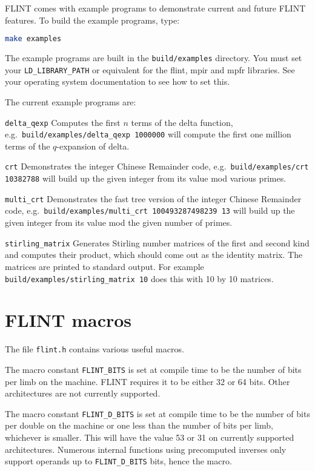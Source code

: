 \documentclass[a4paper,10pt]{book}
\newcommand{\code}{\lstinline}
\begin{document}
FLINT comes with example programs to demonstrate current and future FLINT 
features.  To build the example programs, type:

\begin{lstlisting}[language=bash]
make examples
\end{lstlisting}

The example programs are built in the \code{build/examples} directory.
You must set your \code{LD_LIBRARY_PATH} or equivalent for the flint, mpir
and mpfr libraries. See your operating system documentation to see how to
set this.

The current example programs are:

\code{delta_qexp}  Computes the first $n$ terms of the delta function, e.g.\ 
\code{build/examples/delta_qexp 1000000} will compute the first one million terms of the 
$q$-expansion of delta.

\code{crt}  Demonstrates the integer Chinese Remainder code, e.g.\ 
\code{build/examples/crt 10382788} will build up the given integer from its value mod various
primes.

\code{multi_crt}  Demonstrates the fast tree version of the integer Chinese Remainder 
code, e.g.\ 
\code{build/examples/multi_crt 100493287498239 13} will build up the given integer from 
its value mod the given number of primes.

\code{stirling_matrix}  Generates Stirling number matrices of the first
and second kind and computes their product, which should come out as the
identity matrix. The matrices are printed to standard output.
For example \code{build/examples/stirling_matrix 10} does this
with 10 by 10 matrices.

\chapter{FLINT macros}

The file \code{flint.h} contains various useful macros.

The macro constant \code{FLINT_BITS} is set at compile time to be the 
number of bits per limb on the machine.  FLINT requires it to be either 
32 or 64 bits.  Other architectures are not currently supported.

The macro constant \code{FLINT_D_BITS} is set at compile time to be the 
number of bits per double on the machine or one less than the number of 
bits per limb, whichever is smaller.  This will have the value 53 or 31 
on currently supported architectures.  Numerous internal functions using 
precomputed inverses only support operands up to \code{FLINT_D_BITS} bits, 
hence the macro.
\end{document}
